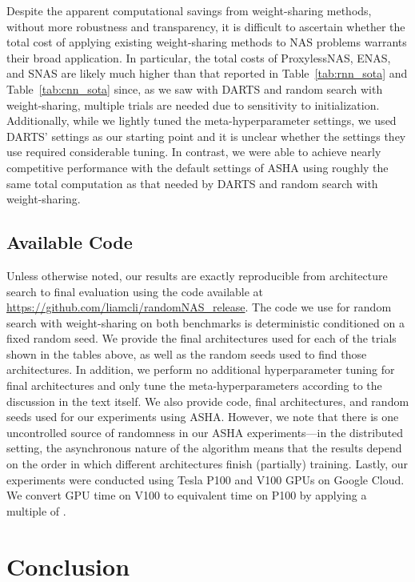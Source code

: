 \documentclass[acmlarge, nonacm]{acmart}
\begin{document}
Despite the apparent computational savings from weight-sharing methods, without more robustness and transparency, it is difficult to ascertain whether the total cost of applying existing weight-sharing methods to NAS problems warrants their broad application.  In particular, the total costs of ProxylessNAS, ENAS, and SNAS are likely much higher than that reported in Table~\ref{tab:rnn_sota} and Table~\ref{tab:cnn_sota} since, as we saw with DARTS and random search with weight-sharing, multiple trials are needed due to sensitivity to initialization. Additionally, while we lightly tuned the meta-hyperparameter settings, we used DARTS' settings as our starting point and it is unclear whether the settings they use required considerable tuning.  In contrast, we were able to achieve nearly competitive performance with the default settings of ASHA using roughly the same total computation as that needed by DARTS and random search with weight-sharing.

\subsection{Available Code}
Unless otherwise noted, our results are exactly reproducible from architecture search to final evaluation using the code available at \url{https://github.com/liamcli/randomNAS_release}.  The code we use for random search with weight-sharing on both benchmarks is deterministic conditioned on a fixed random seed.  We provide the final architectures used for each of the trials shown in the tables above, as well as the random seeds used to find those architectures.  In addition, we perform no additional hyperparameter tuning for final architectures and only tune the meta-hyperparameters according to the discussion in the text itself. We also provide code, final architectures, and random seeds used for our experiments using ASHA.  However, we note that there is one uncontrolled source of randomness in our ASHA experiments---in the distributed setting, the asynchronous nature of the algorithm means that the results depend on the order in which different architectures finish (partially) training. Lastly, our experiments were conducted using Tesla P100 and V100 GPUs on Google Cloud.  We convert GPU time on V100 to equivalent time on P100 by applying a multiple of .


\section{Conclusion}
\end{document}
